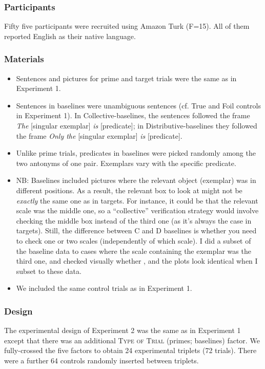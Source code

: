 \documentclass[a4paper, 11pt]{article}
\newcommand{\addMM}[1]{{\leavevmode\color{red}#1}}
\begin{document}
\subsubsection{Participants}
Fifty five participants were recruited using Amazon Turk (F=15). All of them reported English as their native language. 

\subsubsection{Materials}

\begin{itemize}
\item Sentences and pictures for prime and target trials were the same as in Experiment 1. 
\item Sentences in baselines were unambiguous sentences (cf. True and Foil controls in Experiment 1). In Collective-baselines, the sentences followed the frame \textit{The} [singular exemplar] \textit{is} [predicate]; in Distributive-baselines they followed the frame \textit{Only the} [singular exemplar] \textit{is} [predicate]. 
\item Unlike prime trials, predicates in baselines were picked randomly among the two antonyms of one pair. Exemplars vary with the specific predicate. 
\
 \item \addMM{NB: Baselines included pictures where the relevant object (exemplar) was in different positions. As a result, the relevant box to look at might not be \emph{exactly} the same one as in targets. For instance, it could be that the relevant scale was the middle one, so a ``collective'' verification strategy would involve checking the middle box instead of the third one (as it's always the case in targets). Still, the difference between C and D baselines is whether you need to check one or two scales (independently of which scale). I did a subset of the baseline data to cases where the scale containing the exemplar was the third one, and checked visually whether , and the plots look identical when I subset to these data.}

\item  We included the same control trials as in Experiment 1. 
\end{itemize}


\subsubsection{Design}

The experimental design of Experiment 2 was the same as in Experiment 1 except that there was an additional \textsc{Type of Trial} (primes; baselines) factor. We fully-crossed the five factors to obtain 24 experimental triplets (72 trials). There were a further 64 controls randomly inserted between triplets. 
\end{document}
